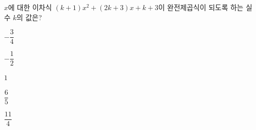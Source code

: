 $x$에 대한 이차식 $(k+1)x^2+(2k+3)x+k+3$이 완전제곱식이 되도록 하는 실수 $k$의 값은?
\begin{choices32}{\rule[-3ex]{0pt}{8ex}$-\dfrac{3}{4}$}{\rule[-3ex]{0pt}{8ex}$-\dfrac{1}{2}$}{\rule[-3ex]{0pt}{8ex}$1$}{\rule[-3ex]{0pt}{8ex}$\dfrac{6}{5}$}{\rule[-3ex]{0pt}{8ex}$\dfrac{11}{4}$}\end{choices32}

